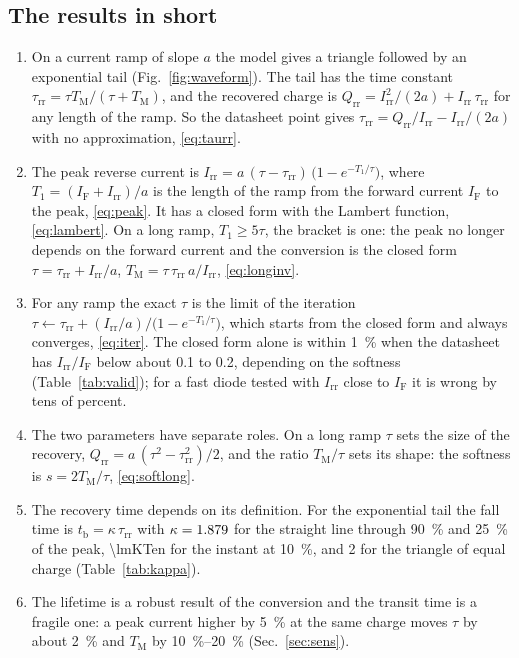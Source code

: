 \documentclass[10pt,a4paper]{scrartcl}
\newcommand{\IF}{I_\mathrm{F}}
\newcommand{\Irr}{I_\mathrm{rr}}
\newcommand{\Qrr}{Q_\mathrm{rr}}
\newcommand{\tb}{t_\mathrm{b}}
\newcommand{\taurr}{\tau_\mathrm{rr}}
\newcommand{\TM}{T_\mathrm{M}}
\newcommand{\Tone}{T_1}
\begin{document}
\subsection*{The results in short}
\begin{enumerate}
\item On a current ramp of slope $a$ the model gives a triangle followed by an exponential tail (Fig.~\ref{fig:waveform}). The tail has the time constant $\taurr = \tau\TM/(\tau+\TM)$, and the recovered charge is $\Qrr = \Irr^2/(2a) + \Irr\,\taurr$ for any length of the ramp. So the datasheet point gives $\taurr = \Qrr/\Irr - \Irr/(2a)$ with no approximation, \eqref{eq:taurr}.
\item The peak reverse current is $\Irr = a\,(\tau-\taurr)\,\bigl(1-e^{-\Tone/\tau}\bigr)$, where $\Tone = (\IF+\Irr)/a$ is the length of the ramp from the forward current $\IF$ to the peak, \eqref{eq:peak}. It has a closed form with the Lambert function, \eqref{eq:lambert}. On a long ramp, $\Tone \geq 5\tau$, the bracket is one: the peak no longer depends on the forward current and the conversion is the closed form $\tau = \taurr + \Irr/a$, $\TM = \tau\,\taurr\,a/\Irr$, \eqref{eq:longinv}.
\item For any ramp the exact $\tau$ is the limit of the iteration $\tau \leftarrow \taurr + (\Irr/a)\big/\bigl(1-e^{-\Tone/\tau}\bigr)$, which starts from the closed form and always converges, \eqref{eq:iter}. The closed form alone is within \SI{1}{\percent} when the datasheet has $\Irr/\IF$ below about \num{0.1} to \num{0.2}, depending on the softness (Table~\ref{tab:valid}); for a fast diode tested with $\Irr$ close to $\IF$ it is wrong by tens of percent.
\item The two parameters have separate roles. On a long ramp $\tau$ sets the size of the recovery, $\Qrr = a\,(\tau^2-\taurr^2)/2$, and the ratio $\TM/\tau$ sets its shape: the softness is $s = 2\TM/\tau$, \eqref{eq:softlong}.
\item The recovery time depends on its definition. For the exponential tail the fall time is $\tb = \kappa\,\taurr$ with $\kappa = 1.879$ for the straight line through \SI{90}{\percent} and \SI{25}{\percent} of the peak, \num{\lmKTen} for the instant at \SI{10}{\percent}, and 2 for the triangle of equal charge (Table~\ref{tab:kappa}).
\item The lifetime is a robust result of the conversion and the transit time is a fragile one: a peak current higher by \SI{5}{\percent} at the same charge moves $\tau$ by about \SI{2}{\percent} and $\TM$ by \SIrange{10}{20}{\percent} (Sec.~\ref{sec:sens}).

\end{enumerate}
\end{document}
